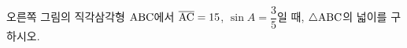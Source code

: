 \noindent\begin{minipage}[t]{0.58\linewidth}\vspace{0pt}\raggedright 오른쪽 그림의 직각삼각형 $\mathrm{ABC}$에서 $\overline{\mathrm{AC}}=15$, $\sin A=\dfrac{3}{5}$일 때, $\triangle\mathrm{ABC}$의 넓이를 구하시오.\end{minipage}\hfill\begin{minipage}[t]{0.4\linewidth}\vspace{0pt}\centering \resizebox{\ifdim\width>\linewidth\linewidth\else\width\fi}{!}{}\end{minipage}\par
